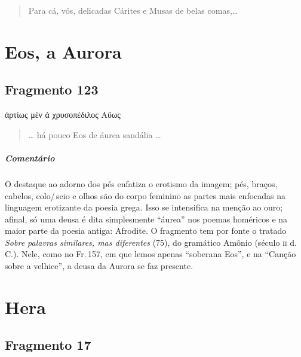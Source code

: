 \begin{verse}
Para cá, vós, delicadas Cárites e Musas de belas \qb{}comas,\ldots{}
\end{verse}


\chapter{Eos, a Aurora}

\section{Fragmento 123}

\begin{gkverse}
ἀρτίως μὲν ἀ χρυσοπέδιλος Αὔως
\end{gkverse}

\begin{verse}
\ldots{} há pouco Eos de áurea sandália \ldots{}
\end{verse}

\medskip

\paragraph{Comentário} O destaque ao adorno dos pés enfatiza o erotismo da imagem; pés, braços,
cabelos, colo/\,seio e olhos são do corpo feminino as partes mais enfocadas na
linguagem erotizante da poesia grega. Isso se intensifica na menção ao ouro;
afinal, só uma deusa é dita simplesmente ``áurea'' nos poemas homéricos
e na maior parte da poesia antiga: Afrodite. O fragmento tem por fonte o
tratado \emph{Sobre palavras similares, mas diferentes} (75), do gramático Amônio
(século \textsc{ii} d.\,C.).
Nele, como no Fr.\,157, em que lemos apenas ``soberana Eos'', e na ``Canção sobre a velhice'', a deusa da Aurora se faz presente.



\chapter{Hera}

\section{Fragmento 17}

